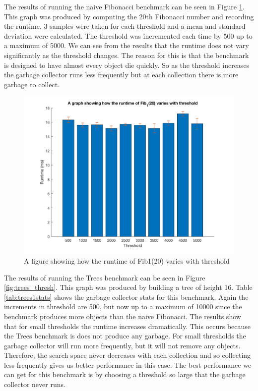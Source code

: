 \documentclass[../diss.tex]{subfiles}
\begin{document}
The results of running the naive Fibonacci benchmark can be seen in Figure \ref{fig:fib_thresh}. This graph was produced by computing the 20th Fibonacci number and recording the runtime, 3 samples were taken for each threshold and a mean and standard deviation were calculated. The threshold was incremented each time by 500 up to a maximum of 5000. We can see from the results that the runtime does not vary significantly as the threshold changes. The reason for this is that the benchmark is designed to have almost every object die quickly. So as the threshold increases the garbage collector runs less frequently but at each collection there is more garbage to collect.

\begin{figure}
    \centering
    \includegraphics[max width=\linewidth]{figs/fib_threshold.png}
    \caption{A figure showing how the runtime of Fib1(20) varies with threshold}
    \label{fig:fib_thresh}
\end{figure}

The results of running the Trees benchmark can be seen in Figure \ref{fig:trees_thresh}. This graph was produced by building a tree of height 16. Table \ref{tab:trees1stats} shows the garbage collector stats for this benchmark. Again the increments in threshold are 500, but now up to a maximum of 10000 since the benchmark produces more objects than the naive Fibonacci. The results show that for small thresholds the runtime increases dramatically. This occurs because the Trees benchmark is does not produce any garbage. For small thresholds the garbage collector will run more frequently, but it will not remove any objects. Therefore, the search space never decreases with each collection and so collecting less frequently gives us better performance in this case. The best performance we can get for this benchmark is by choosing a threshold so large that the garbage collector never runs.
\end{document}
